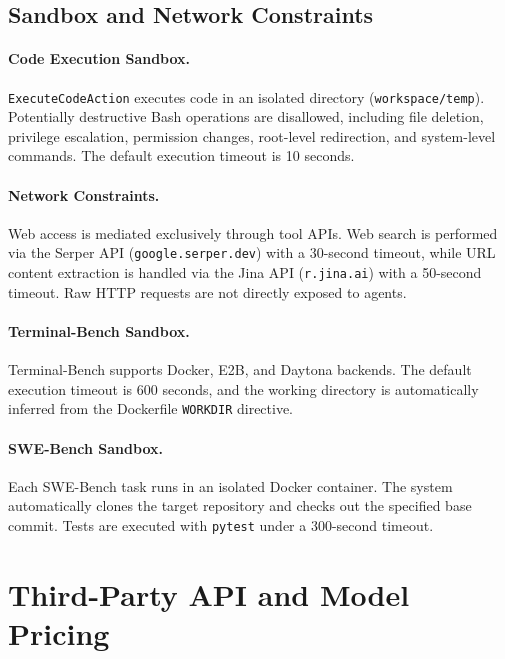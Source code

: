 \subsection{Sandbox and Network Constraints}

\paragraph{Code Execution Sandbox.}
\texttt{ExecuteCodeAction} executes code in an isolated directory (\texttt{workspace/temp}). Potentially destructive Bash operations are disallowed, including file deletion, privilege escalation, permission changes, root-level redirection, and system-level commands. The default execution timeout is 10 seconds.

\paragraph{Network Constraints.}
Web access is mediated exclusively through tool APIs. Web search is performed via the Serper API (\texttt{google.serper.dev}) with a 30-second timeout, while URL content extraction is handled via the Jina API (\texttt{r.jina.ai}) with a 50-second timeout. Raw HTTP requests are not directly exposed to agents.

\paragraph{Terminal-Bench Sandbox.}
Terminal-Bench supports Docker, E2B, and Daytona backends. The default execution timeout is 600 seconds, and the working directory is automatically inferred from the Dockerfile \texttt{WORKDIR} directive.

\paragraph{SWE-Bench Sandbox.}
Each SWE-Bench task runs in an isolated Docker container. The system automatically clones the target repository and checks out the specified base commit. Tests are executed with \texttt{pytest} under a 300-second timeout.




\section{Third-Party API and Model Pricing}
\label{app:E}

